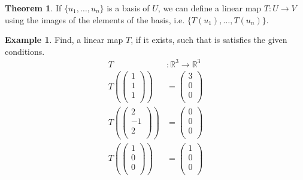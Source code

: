 \documentclass[fleqn, a4paper, 12pt]{article}
\theoremstyle{definition}
\newtheorem{example}{Example}
\theoremstyle{theorem}
\newtheorem{theorem}{Theorem}
\begin{document}
\begin{theorem}
	If $\{u_1, \dots, u_n\}$ is a basis of $U$, we can define a linear map $T : U \to V$ using the images of the elements of the basis, i.e. $\{T(u_1), \dots, T(u_n)\}$.
\end{theorem}

\begin{example}
	Find, a linear map $T$, if it exists, such that is satisfies the given conditions.
	\begin{align*}
		T &: \mathbb{R}^3 \to \mathbb{R}^3\\
		T
		\left(
			\begin{pmatrix}
				1\\
				1\\
				1\\
			\end{pmatrix}
		\right)
		&=
		\begin{pmatrix}
			3\\
			0\\
			0\\
		\end{pmatrix}\\
		T
		\left(
			\begin{pmatrix}
			2\\
			-1\\
			2\\
			\end{pmatrix}
		\right)
		&=
		\begin{pmatrix}
			0\\
			0\\
			0\\
		\end{pmatrix}\\
		T
		\left(
			\begin{pmatrix}
				1\\
				0\\
				0\\
			\end{pmatrix}
		\right)
		&=
		\begin{pmatrix}
			1\\
			0\\
			0\\
		\end{pmatrix}\\
	\end{align*}
\end{example}
\end{document}

